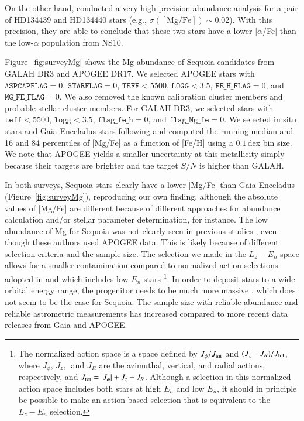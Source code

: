 \documentclass{aa}
\begin{document}
On the other hand, \citet{Reggiani2018a} conducted a very high precision abundance analysis for a pair of HD134439 and HD134440 stars (e.g., $\sigma([\mathrm{Mg/Fe}])\sim 0.02$).
With this precision, they are able to conclude that these two stars have a lower [$\alpha$/{Fe}] than the low-$\alpha$ population from NS10.  

Figure~\ref{fig:surveyMg} shows the Mg abundance of Sequoia candidates from GALAH DR3 and APOGEE DR17.
We selected APOGEE stars with $\mathtt{ASPCAPFLAG}=0$, $\mathtt{STARFLAG}=0$, $\mathtt{TEFF}<5500$, $\mathtt{LOGG}<3.5$, $\texttt{FE\_H\_FLAG}=0$, and $\texttt{MG\_FE\_FLAG}=0$. 
We also removed the known calibration cluster members and probable stellar cluster members.
For GALAH DR3, we selected stars with $\texttt{teff}<5500$, $\texttt{logg}<3.5$, $\texttt{flag\_fe\_h}=0$, and $\texttt{flag\_Mg\_fe}=0$.
We selected in situ stars and Gaia-Enceladus stars following \citet{Matsuno2021b} and computed the running median and 16 and 84 percentiles of [{Mg}/{Fe}] as a function of [{Fe}/{H}] using a $0.1\,\mathrm{dex}$ bin size. 
We note that APOGEE yields a smaller uncertainty at this metallicity simply because their targets are brighter and the target $S/N$ is higher than GALAH.

In both surveys, Sequoia stars clearly have a lower [{Mg}/{Fe}] than Gaia-Enceladus (Figure~\ref{fig:surveyMg}), reproducing our own finding, although the absolute values of [{Mg}/{Fe}] are different because of different approaches for abundance calculation and/or stellar parameter determination, for instance.
The low abundance of Mg for Sequoia was not clearly seen in previous studies \citep[e.g.,][]{Koppelman2019a,Myeong2019a,Feuillet2021a}, even though these authors used APOGEE data.
This is likely because of different selection criteria and the sample size.
The selection we made in the $L_z-E_n$ space allows for a smaller contamination compared to normalized action selections adopted in \citet{Myeong2019a} and \citet{Feuillet2021a} which includes low-$E_n$ stars
\footnote{The normalized action space is a space defined by $J_\phi/J_{\rm tot}$ and $(J_z-J_R)/J_{\rm tot}$, where $J_\phi,\,J_z, \,$ and $J_R$ are the azimuthal, vertical, and radial actions, respectively, and $J_{\rm tot}=|J_{\phi}|+J_z+J_R$. Although a selection in this normalized action space includes both stars at high $E_n$ and low $E_n$, it should in principle  be possible to make an action-based selection that is equivalent to the $L_z-E_n$ selection.}.
In order to deposit stars to a wide orbital energy range, the progenitor needs to be much more massive \citep{Koppelman2019a}, which does not seem to be the case for Sequoia.
The sample size with reliable abundance and reliable astrometric measurements has increased compared to more recent data releases from Gaia and APOGEE. 
\end{document}
